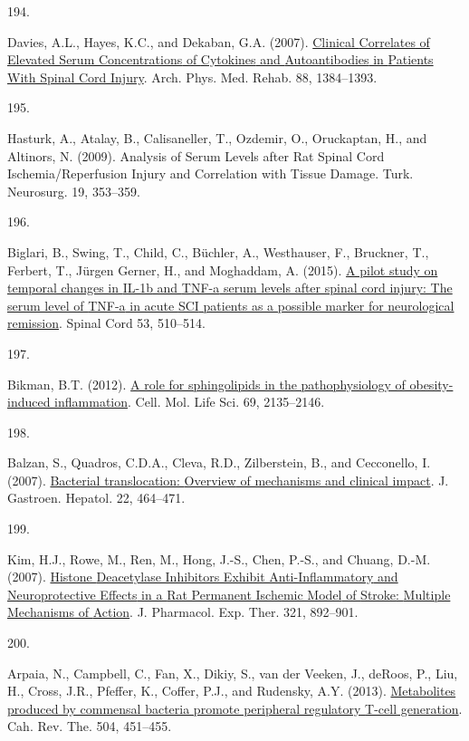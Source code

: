 \documentclass[
]{article}
\newlength{\cslhangindent}
\newlength{\csllabelwidth}
\newlength{\cslentryspacingunit} %
\newenvironment{CSLReferences}[2] %
 {%
  \setlength{\parindent}{0pt}
  \ifodd #1
  \let\oldpar\par
  \def\par{\hangindent=\cslhangindent\oldpar}
  \fi
  \setlength{\parskip}{#2\cslentryspacingunit}
 }%
 {}
\newcommand{\CSLLeftMargin}[1]{\parbox[t]{\csllabelwidth}{#1}}
\newcommand{\CSLRightInline}[1]{\parbox[t]{\linewidth - \csllabelwidth}{#1}\break}
\begin{document}
\begin{CSLReferences}{0}{0}
\leavevmode{}%
\CSLLeftMargin{194. }
\CSLRightInline{Davies, A.L., Hayes, K.C., and Dekaban, G.A. (2007). \href{https://doi.org/10.1016/j.apmr.2007.08.004}{Clinical {Correlates} of {Elevated Serum Concentrations} of {Cytokines} and {Autoantibodies} in {Patients With Spinal Cord Injury}}. Arch. Phys. Med. Rehab. 88, 1384--1393.}

\leavevmode{}%
\CSLLeftMargin{195. }
\CSLRightInline{Hasturk, A., Atalay, B., Calisaneller, T., Ozdemir, O., Oruckaptan, H., and Altinors, N. (2009). Analysis of {Serum Levels} after {Rat Spinal Cord Ischemia}/{Reperfusion Injury} and {Correlation} with {Tissue Damage}. Turk. Neurosurg. 19, 353--359.}

\leavevmode{}%
\CSLLeftMargin{196. }
\CSLRightInline{Biglari, B., Swing, T., Child, C., Büchler, A., Westhauser, F., Bruckner, T., Ferbert, T., Jürgen Gerner, H., and Moghaddam, A. (2015). \href{https://doi.org/10.1038/sc.2015.28}{A pilot study on temporal changes in {IL-1b} and {TNF-a} serum levels after spinal cord injury: The serum level of {TNF-a} in acute {SCI} patients as a possible marker for neurological remission}. Spinal Cord 53, 510--514.}

\leavevmode{}%
\CSLLeftMargin{197. }
\CSLRightInline{Bikman, B.T. (2012). \href{https://doi.org/10.1007/s00018-012-0917-5}{A role for sphingolipids in the pathophysiology of obesity-induced inflammation}. Cell. Mol. Life Sci. 69, 2135--2146.}

\leavevmode{}%
\CSLLeftMargin{198. }
\CSLRightInline{Balzan, S., Quadros, C.D.A., Cleva, R.D., Zilberstein, B., and Cecconello, I. (2007). \href{https://doi.org/10.1111/j.1440-1746.2007.04933.x}{Bacterial translocation: {Overview} of mechanisms and clinical impact}. J. Gastroen. Hepatol. 22, 464--471.}

\leavevmode{}%
\CSLLeftMargin{199. }
\CSLRightInline{Kim, H.J., Rowe, M., Ren, M., Hong, J.-S., Chen, P.-S., and Chuang, D.-M. (2007). \href{https://doi.org/10.1124/jpet.107.120188}{Histone {Deacetylase Inhibitors Exhibit Anti-Inflammatory} and {Neuroprotective Effects} in a {Rat Permanent Ischemic Model} of {Stroke}: {Multiple Mechanisms} of {Action}}. J. Pharmacol. Exp. Ther. 321, 892--901.}

\leavevmode{}%
\CSLLeftMargin{200. }
\CSLRightInline{Arpaia, N., Campbell, C., Fan, X., Dikiy, S., van der Veeken, J., deRoos, P., Liu, H., Cross, J.R., Pfeffer, K., Coffer, P.J., and Rudensky, A.Y. (2013). \href{https://doi.org/10.1038/nature12726}{Metabolites produced by commensal bacteria promote peripheral regulatory {T-cell} generation}. Cah. Rev. The. 504, 451--455.}


\end{CSLReferences}
\end{document}
